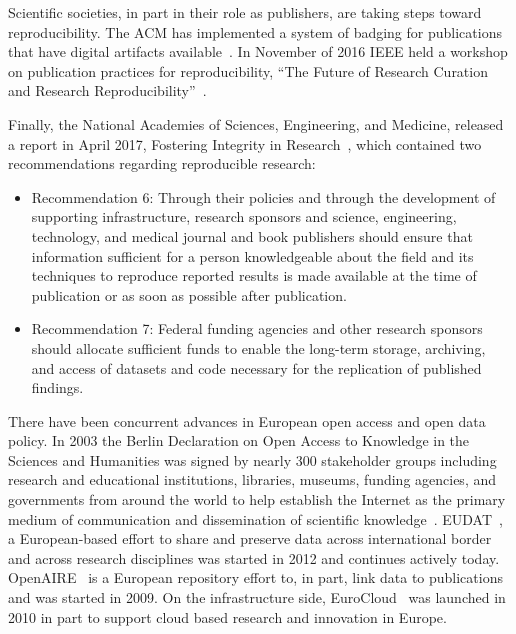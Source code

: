 \documentclass[review]{elsarticle}
\begin{document}
Scientific societies, in part in their role as publishers, are taking steps toward reproducibility. The ACM has implemented a system of badging for publications that have digital artifacts available~\cite{victoria13}. In November of 2016 IEEE held a workshop on publication practices for reproducibility, ``The Future of Research Curation and Research Reproducibility''~\cite{victoria14}.

Finally, the National Academies of Sciences, Engineering, and Medicine, released a report in April 2017, Fostering Integrity in Research~\cite{NAP21896}, which contained two recommendations regarding reproducible research:

\begin{itemize}

\item Recommendation 6: Through their policies and through the development of supporting infrastructure, research sponsors and science, engineering, technology, and medical journal and book publishers should ensure that information sufficient for a person knowledgeable about the field and its techniques to reproduce reported results is made available at the time of publication or as soon as possible after publication. 
\item Recommendation 7: Federal funding agencies and other research sponsors should allocate sufficient funds to enable the long-term storage, archiving, and access of datasets and code necessary for the replication of published findings. 

\end{itemize}

There have been concurrent advances in European open access and open data policy. In 2003 the Berlin Declaration on Open Access to Knowledge in the Sciences and Humanities was signed by nearly 300 stakeholder groups including research and educational institutions, libraries, museums, funding agencies, and governments from around the world to help establish the Internet as the primary medium of communication and dissemination of scientific knowledge~\cite{berlindeclaration}.  
EUDAT~\cite{eudat}, a European-based effort to share and preserve data across international border and across research disciplines was started in 2012 and continues actively today.
OpenAIRE~\cite{openaire} is a European repository effort to, in part, link data to publications and was started in 2009. 
On the infrastructure side, EuroCloud~\cite{eurocloud} was launched in 2010 in part to support cloud based research and innovation in Europe.
\end{document}
